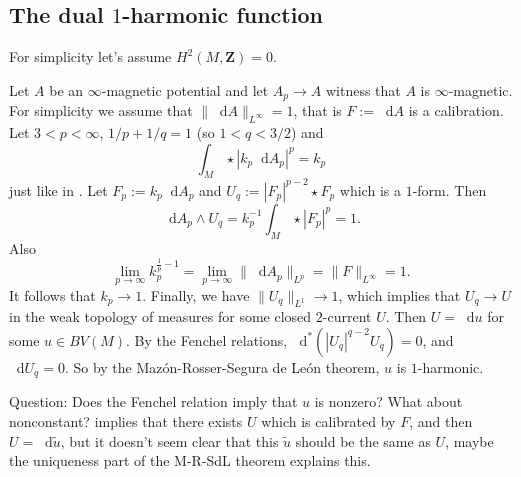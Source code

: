 \documentclass[reqno,11pt]{amsart}
\newcommand{\ZZ}{\mathbf{Z}}
\newcommand*\dif{\mathop{}\!\mathrm{d}}
\theoremstyle{definition}
\numberwithin{equation}{section}
\begin{document}
\subsection{The dual $1$-harmonic function}
For simplicity let's assume $H^2(M, \ZZ) = 0$.

Let $A$ be an $\infty$-magnetic potential and let $A_p \to A$ witness that $A$ is $\infty$-magnetic.
For simplicity we assume that $\|\dif A\|_{L^\infty} = 1$, that is $F := \dif A$ is a calibration.
Let $3 < p < \infty$, $1/p + 1/q = 1$ (so $1 < q < 3/2$) and
$$\int_M \star |k_p \dif A_p|^p = k_p$$
just like in \cite[\S3.2]{daskalopoulos2020transverse}.
Let $F_p := k_p \dif A_p$ and $U_q := |F_p|^{p - 2} \star F_p$ which is a $1$-form.
Then 
$$\dif A_p \wedge U_q = k_p^{-1} \int_M \star |F_p|^p = 1.$$
Also 
$$\lim_{p \to \infty} k_p^{\frac{1}{p} - 1} = \lim_{p \to \infty} \|\dif A_p\|_{L^p} = \|F\|_{L^\infty} = 1.$$
It follows that $k_p \to 1$.
Finally, we have $\|U_q\|_{L^1} \to 1$, which implies that $U_q \to U$ in the weak topology of measures for some closed $2$-current $U$.
Then $U = \dif u$ for some $u \in BV(M)$.
By the Fenchel relations, $\dif^*(|U_q|^{q - 2} U_q) = 0$, and $\dif U_q = 0$.
So by the Maz\'on-Rosser-Segura de Le\'on theorem, $u$ is $1$-harmonic.

Question: Does the Fenchel relation imply that $u$ is nonzero?
What about nonconstant?
\cite{bangert_cui_2017} implies that there exists $U$ which is calibrated by $F$, and then $U = \dif \tilde u$, but it doesn't seem clear that this $\tilde u$ should be the same as $U$, maybe the uniqueness part of the M-R-SdL theorem explains this.
\end{document}
